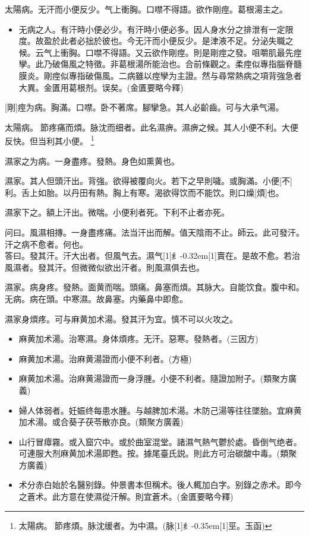 \documentclass[oneside,b4paper]{ctexbook}
\begin{document}
\begin{flushleft}
太陽病。无汗而小便反少。气上衝胸。口噤不得語。欲作剛痙。葛根湯主之。

\begin{itemize}
\item 无病之人。有汗時小便必少。有汗時小便必多。因人身水分之排泄有一定限度。故盈於此者必拙於彼也。今无汗而小便反少。是津液不足。分泌失職之候。云气上衝胸。口噤不得語。又云欲作剛痙。則是剛痙之發。咀嚼肌最先痙孿。此乃破傷風之特徵。非葛根湯所能治也。合前條觀之。柔痙似專指腦脊髓膜炎。剛痙似專指破傷風。二病雖以痙孿为主證。然与尋常熱病之項背強急者大異。金匱用葛根剂。误矣。(金匱要略今釋)
\end{itemize}

[剛]痙为病。胸滿。口噤。卧不著席。腳攣急。其人必齘齒。可与大承气湯。

太陽病。{𬮦}節疼痛而煩。脉沈而细者。此名濕痹。濕痹之候。其人小便不利。大便反快。但当利其小便。
\footnote{太陽病。{𬮦}節疼煩。脉沈缓者。为中濕。(脉{\hbox{\scalebox{0.68}[1]{纟}\kern-0.35em\scalebox{0.64}[1]{巠}}}。玉函)}

濕家之为病。一身盡疼。發熱。身色如熏黄也。

濕家。其人但頭汗出。背強。欲得被覆向火。若下之早則噦。或胸滿。小便[不]利。舌上如胎。以丹田有熱。胸上有寒。渴欲得饮而不能饮。則口燥[煩]也。

濕家下之。額上汗出。微喘。小便利者死。下利不止者亦死。

问曰。風濕相摶。一身盡疼痛。法当汗出而解。值天陰雨不止。師云。此可發汗。汗之病不愈者。何也。\\
答曰。發其汗。汗大出者。但風气去。濕气{\hbox{\scalebox{0.6}[1]{纟}\kern-0.32em\scalebox{0.7}[1]{賣}}}在。是故不愈。若治風濕者。發其汗。但微微似欲出汗者。則風濕俱去也。

濕家。病身疼。發熱。面黄而喘。頭痛。鼻塞而煩。其脉大。自能饮食。腹中和。无病。病在頭。中寒濕。故鼻塞。内藥鼻中即愈。

濕家身煩疼。可与麻黄加术湯。發其汗为宜。慎不可以火攻之。

\begin{itemize}
\item 麻黄加术湯。治寒濕。身体煩疼。无汗。惡寒。發熱者。(三因方)
\item 麻黄加术湯。治麻黄湯證而小便不利者。(方極)
\item 麻黄加术湯。治麻黄湯證而一身浮腫。小便不利者。隨證加附子。(類聚方廣義)
\item 婦人体弱者。妊娠终每患水腫。与越脾加术湯。木防己湯等往往墜胎。宜麻黄加术湯。或合葵子茯苓散亦良。(類聚方廣義)
\item 山行冒瘴霧。或入窟穴中。或於曲室混堂。諸濕气熱气鬱於處。昏倒气绝者。可連服大剂麻黄加术湯即甦。按。據尾臺氏説。則此方可治碳酸中毒。(類聚方廣義)
\item 术分赤白始於名醫别錄。仲景書本但稱术。後人輒加白字。别錄之赤术。即今之蒼术。此方意在使濕從汗解。則宜蒼术。(金匱要略今釋)
\end{itemize}


\end{flushleft}
\end{document}
